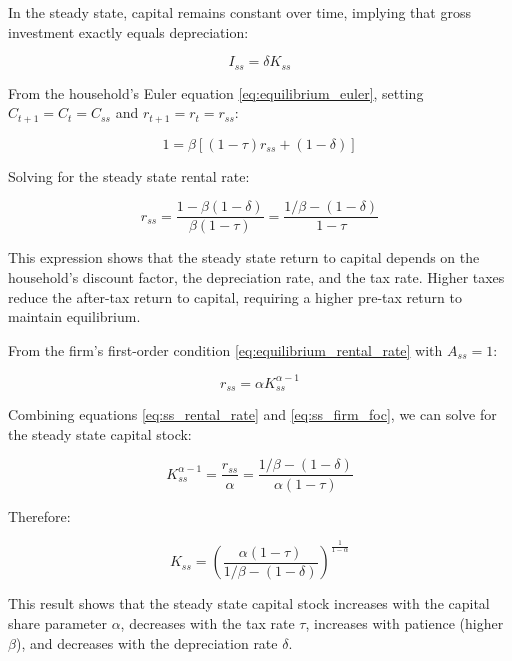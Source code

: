 \documentclass[5p,authoryear]{elsarticle}
\begin{document}
In the steady state, capital remains constant over time, implying that gross investment exactly equals depreciation:

\begin{equation}
I_{ss} = \delta K_{ss}
\label{eq:ss_investment}
\end{equation}

From the household's Euler equation \eqref{eq:equilibrium_euler}, setting $C_{t+1} = C_t = C_{ss}$ and $r_{t+1} = r_t = r_{ss}$:

\begin{equation}
1 = \beta \left[ (1-\tau) r_{ss} + (1-\delta) \right]
\label{eq:ss_euler}
\end{equation}

Solving for the steady state rental rate:

\begin{equation}
r_{ss} = \frac{1 - \beta(1-\delta)}{\beta(1-\tau)} = \frac{1/\beta - (1-\delta)}{1-\tau}
\label{eq:ss_rental_rate}
\end{equation}

This expression shows that the steady state return to capital depends on the household's discount factor, the depreciation rate, and the tax rate. Higher taxes reduce the after-tax return to capital, requiring a higher pre-tax return to maintain equilibrium.

From the firm's first-order condition \eqref{eq:equilibrium_rental_rate} with $A_{ss} = 1$:

\begin{equation}
r_{ss} = \alpha K_{ss}^{\alpha-1}
\label{eq:ss_firm_foc}
\end{equation}

Combining equations \eqref{eq:ss_rental_rate} and \eqref{eq:ss_firm_foc}, we can solve for the steady state capital stock:

\begin{equation}
K_{ss}^{\alpha-1} = \frac{r_{ss}}{\alpha} = \frac{1/\beta - (1-\delta)}{\alpha(1-\tau)}
\label{eq:ss_capital_intermediate}
\end{equation}

Therefore:

\begin{equation}
K_{ss} = \left( \frac{\alpha(1-\tau)}{1/\beta - (1-\delta)} \right)^{\frac{1}{1-\alpha}}
\label{eq:ss_capital}
\end{equation}

This result shows that the steady state capital stock increases with the capital share parameter $\alpha$, decreases with the tax rate $\tau$, increases with patience (higher $\beta$), and decreases with the depreciation rate $\delta$.
\end{document}
